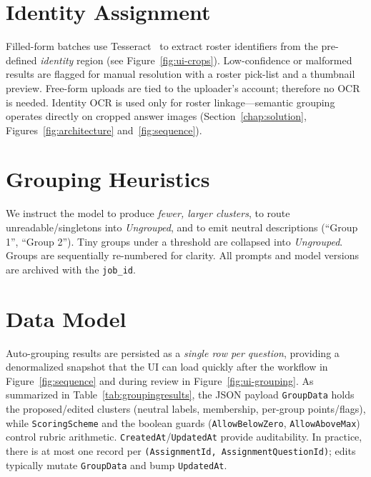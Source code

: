 \documentclass[ms,twoside,print]{nuthesis}
\begin{document}
\section{Identity Assignment}
Filled-form batches use Tesseract~\cite{tesseract} to extract roster identifiers from the pre-defined \emph{identity} region (see Figure~\ref{fig:ui-crops}). Low-confidence or malformed results are flagged for manual resolution with a roster pick-list and a thumbnail preview. Free-form uploads are tied to the uploader’s account; therefore no OCR is needed. Identity OCR is used only for roster linkage—semantic grouping operates directly on cropped answer images (Section~\ref{chap:solution}, Figures~\ref{fig:architecture} and~\ref{fig:sequence}).

\section{Grouping Heuristics}
We instruct the model to produce \emph{fewer, larger clusters}, to route unreadable/singletons into \emph{Ungrouped}, and to emit neutral descriptions (\enquote{Group 1}, \enquote{Group 2}). Tiny groups under a threshold are collapsed into \emph{Ungrouped}. Groups are sequentially re-numbered for clarity. All prompts and model versions are archived with the \texttt{job\_id}.

\section{Data Model}
Auto-grouping results are persisted as a \emph{single row per question}, providing a denormalized snapshot that the UI can load quickly after the workflow in Figure~\ref{fig:sequence} and during review in Figure~\ref{fig:ui-grouping}. As summarized in Table~\ref{tab:groupingresults}, the JSON payload \texttt{GroupData} holds the proposed/edited clusters (neutral labels, membership, per-group points/flags), while \texttt{ScoringScheme} and the boolean guards (\texttt{AllowBelowZero}, \texttt{AllowAboveMax}) control rubric arithmetic. \texttt{CreatedAt}/\texttt{UpdatedAt} provide auditability. In practice, there is at most one record per \texttt{(AssignmentId, AssignmentQuestionId)}; edits typically mutate \texttt{GroupData} and bump \texttt{UpdatedAt}.
\end{document}
